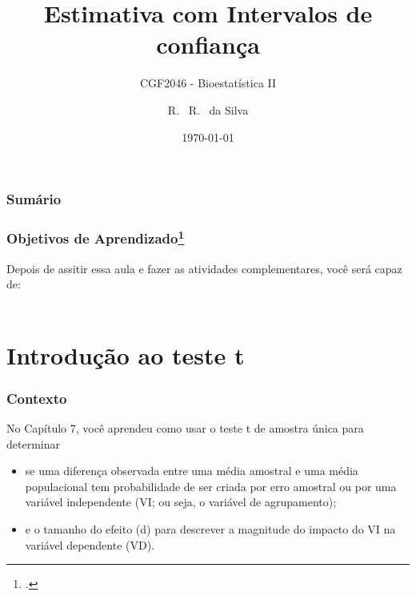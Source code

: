 \documentclass[11pt]{beamer}
\title[Bioestatística II] %
{Estimativa com Intervalos de confiança}
\subtitle{CGF2046 - Bioestatística II}
\author[da Silva, Ricardo] %
{R. ~R. ~da Silva\inst{1}}
\institute[FCFRP] %
{
  \inst{1}%
  Departamento de Ciências BioMoleculares\\
  Faculdade de Ciências Farmacêuticas

}
\date{\today} %
\begin{document}


\begin{frame}
\titlepage
\end{frame}

\begin{frame}
\label{contents}
\frametitle{Sumário}
\tableofcontents
\end{frame}

\begin{frame}
\frametitle{Objetivos de Aprendizado\footcite{carlson2017introduction}}
  Depois de assitir essa aula e fazer as atividades complementares, você será capaz de:
  \\~\\
  \begin{itemize}
  \end{itemize}
\end{frame}

\section{Introdução ao teste t}
\begin{frame}
\frametitle{Contexto}
No Capítulo 7, você aprendeu como usar o teste t de amostra única para determinar 
\begin{itemize}
\item se uma diferença observada entre uma média amostral e uma média populacional tem probabilidade de ser criada por erro amostral ou por uma variável independente (VI; ou seja, o variável de agrupamento); 
\item e o tamanho do efeito (d) para descrever a magnitude do impacto do VI na variável dependente (VD).
\end{itemize}

\end{frame}
\end{document}

